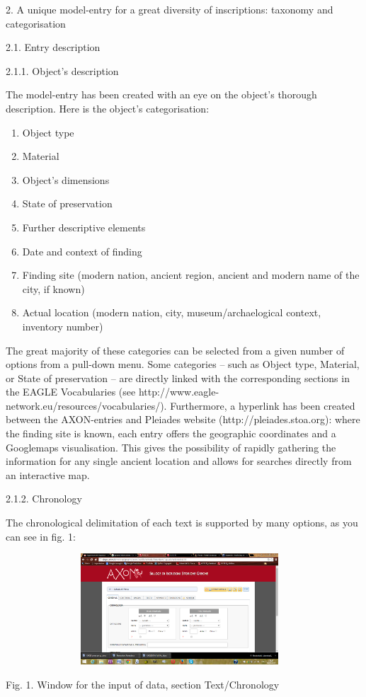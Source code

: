 \documentclass[amsthm,ebook]{saparticle}
\begin{document}
\bigskip

2. A unique model-entry for a great diversity of inscriptions: taxonomy and categorisation


\bigskip

2.1. Entry description


\bigskip

2.1.1. Object’s description

The model-entry has been created with an eye on the object’s thorough description. Here is the object’s categorisation:

\begin{enumerate}
\item Object type
\item Material
\item Object’s dimensions
\item State of preservation
\item Further descriptive elements
\item Date and context of finding
\item Finding site (modern nation, ancient region, ancient and modern name of the city, if known)
\item Actual location (modern nation, city, museum/archaelogical context, inventory number)
\end{enumerate}
The great majority of these categories can be selected from a given number of options from a pull-down menu. Some
categories – such as Object type, Material, or State of preservation – are directly linked with the corresponding
sections in the EAGLE Vocabularies (see http://www.eagle-network.eu/resources/vocabularies/). Furthermore, a hyperlink
has been created between the AXON-entries and Pleiades website (http://pleiades.stoa.org): where the finding site is
known, each entry offers the geographic coordinates and a Googlemaps visualisation. This gives the possibility of
rapidly gathering the information for any single ancient location and allows for searches directly from an interactive
map.


\bigskip

2.1.2. Chronology

The chronological delimitation of each text is supported by many options, as you can see in fig. 1:

\begin{figure}
\centering
\includegraphics[width=10.88cm,height=4.156cm]{EAGLE2016FullPaperrevised-img001.png}
\end{figure}
Fig. 1. Window for the input of data, section Text/Chronology
\end{document}
